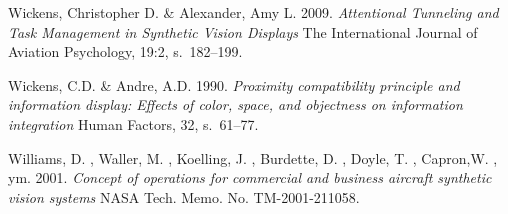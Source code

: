 \documentclass[utf8,bachelor,manualbib]{gradu3}
\begin{document}
\begin{thebibliography}{}
Wickens, Christopher D. \& Alexander, Amy L. 2009.
\textit{Attentional Tunneling and Task Management in Synthetic Vision Displays}
The International Journal of Aviation Psychology, 19:2, s.~182--199.

Wickens, C.D. \& Andre, A.D. 1990.
\textit{Proximity compatibility principle and information display: Effects
of color, space, and objectness on information integration}
Human Factors, 32, s.~61--77.

Williams, D. , Waller, M. , Koelling, J. , Burdette, D. , Doyle, T. , Capron,W. , ym. 2001.
\textit{Concept of operations for commercial and business aircraft synthetic vision systems}
NASA Tech. Memo. No. TM-2001-211058.

\end{thebibliography}
\end{document}
